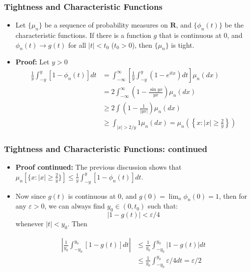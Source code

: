 \documentclass[handout]{beamer}
\begin{document}

\frame
{
  \frametitle{Tightness and Characteristic Functions}

 \begin{itemize}
 
 \item<1->[] \begin{Lemma}[11.1.13]
 Let $\{\mu_n\}$ be a sequence of probability measures on $\mathbf{R}$, and $\{\phi_n(t)\}$ be the characteristic functions. If there is a function $g$ that is continuous at 0, and $\phi_n(t)\rightarrow g(t)$ for all $|t|<t_0$ ($t_0>0$), then $\{\mu_n\}$ is tight. 
 \end{Lemma}
 
 \item<2-> \textbf{Proof:} 
 Let $y > 0$
\begin{align*} 
\frac{1}{y} \int_{-y}^{y} [1-\phi_n(t)] dt
& = \int_{-\infty}^{\infty} \left[ \frac{1}{y} \int_{-y}^{y} (1-e^{itx}) dt \right]\mu_n (dx)  \\
&= 2 \int_{-\infty}^{\infty} (1-\frac{\sin y x}{y x}) \mu_n (dx)  \\
&\geq 2\int (1-\frac{1}{|y x|}) \mu_n (dx)  \\ 
&\geq \int_{|x| > 2/y} 1 \mu_n (dx)  = \mu_n\left( \left\{x: |x| \geq \frac{2}{y} \right\} \right)  
\end{align*} 


\end{itemize}
 }



\frame
{
  \frametitle{Tightness and Characteristic Functions: continued}

 \begin{itemize}
 
 \item<1-> \textbf{Proof continued:} The previous discussion shows that $\mu_n[\{x: |x| \geq \frac{2}{y}\}] \leq \frac{1}{y} \int_{-y}^{y} [1-\phi_n(t)] dt$. 
 
\item<2->[-] Now since $g(t)$ is continuous at 0, and $g(0)=\lim_n \phi_n(0)=1$, then for any $\varepsilon>0$, we can always find $y_0 \in (0,t_0)$ such that:
$$
|1 - g(t)| < \varepsilon / 4
$$
whenever $|t| < y_0$. Then

\begin{align*}
\left| \frac{1}{y_0} \int_{-y_0}^{y_0} [1-g(t)] dt \right| &\le  \frac{1}{y_0} \int_{-y_0}^{y_0} \left|1-g(t)\right| dt \\
&\le  \frac{1}{y_0} \int_{-y_0}^{y_0} \varepsilon/4 dt = \varepsilon/2 \\
\end{align*}
\end{itemize}
 }
 
\end{document}
